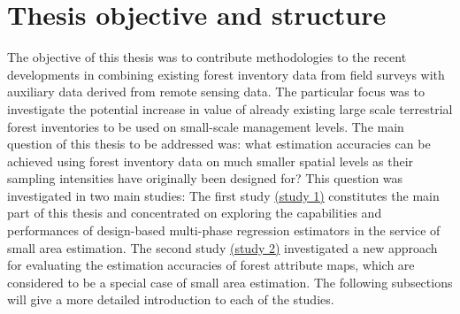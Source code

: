 






\newpage
\section{Thesis objective and structure}
\label{sec:intro:obj_and_struct}

The objective of this thesis was to contribute methodologies to the recent developments in combining existing forest inventory data from field surveys with auxiliary data derived from remote sensing data. The particular focus was to investigate the potential increase in value of already existing large scale terrestrial forest inventories to be used on small-scale management levels. The main question of this thesis to be addressed was: what estimation accuracies can be achieved using forest inventory data on much smaller spatial levels as their sampling intensities have originally been designed for? This question was investigated in two main studies: The first study \hyperref[sec:study1]{(study 1)} constitutes the main part of this thesis and concentrated on exploring the capabilities and performances of design-based multi-phase regression estimators in the service of small area estimation. The second study \hyperref[sec:study2]{(study 2)} investigated a new approach for evaluating the estimation accuracies of forest attribute maps, which are considered to be a special case of small area estimation. The following subsections will give a more detailed introduction to each of the studies.


